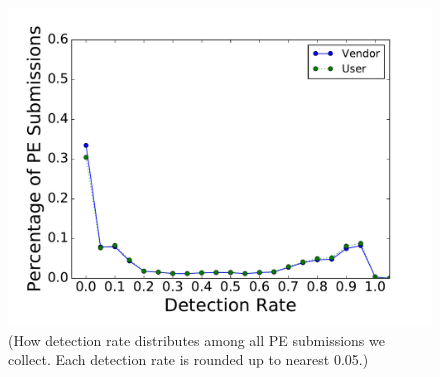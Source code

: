 \begin{figure}[!htb]
  \includegraphics[width=\linewidth]{figure/DetectionRate}
{\footnotesize{(How detection rate distributes among all PE submissions we collect. 
Each detection rate is rounded up to nearest 0.05.)}}
\endminipage\hfill

\end{figure}